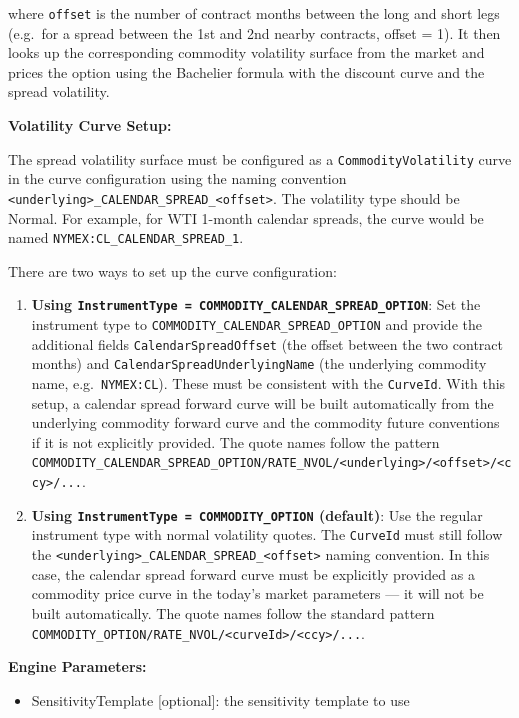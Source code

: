 where \texttt{offset} is the number of contract months between the long and short legs (e.g.\ for a spread between the
1st and 2nd nearby contracts, offset = 1). It then looks up the corresponding commodity volatility surface from the
market and prices the option using the Bachelier formula with the discount curve and the spread volatility.

\textbf{Volatility Curve Setup:}

The spread volatility surface must be configured as a \texttt{CommodityVolatility} curve in the curve configuration
using the naming convention \texttt{<underlying>\_CALENDAR\_SPREAD\_<offset>}. The volatility type should be Normal.
For example, for WTI 1-month calendar spreads, the curve would be named \texttt{NYMEX:CL\_CALENDAR\_SPREAD\_1}.

There are two ways to set up the curve configuration:

\begin{enumerate}
\item \textbf{Using \texttt{InstrumentType = COMMODITY\_CALENDAR\_SPREAD\_OPTION}}: Set the instrument type to
  \texttt{COMMODITY\_CALENDAR\_SPREAD\_OPTION} and provide the additional fields \texttt{CalendarSpreadOffset} (the
  offset between the two contract months) and \texttt{CalendarSpreadUnderlyingName} (the underlying commodity name,
  e.g.\ \texttt{NYMEX:CL}). These must be consistent with the \texttt{CurveId}. With this setup, a calendar spread
  forward curve will be built automatically from the underlying commodity forward curve and the commodity future
  conventions if it is not explicitly provided. The quote names follow the pattern
  \texttt{COMMODITY\_CALENDAR\_SPREAD\_OPTION/RATE\_NVOL/<underlying>/<offset>/<ccy>/...}.

\item \textbf{Using \texttt{InstrumentType = COMMODITY\_OPTION} (default)}: Use the regular instrument type with normal
  volatility quotes. The \texttt{CurveId} must still follow the
  \texttt{<underlying>\_CALENDAR\_SPREAD\_<offset>} naming convention. In this case, the calendar spread forward curve
  must be explicitly provided as a commodity price curve in the today's market parameters --- it will not be built
  automatically. The quote names follow the standard pattern
  \texttt{COMMODITY\_OPTION/RATE\_NVOL/<curveId>/<ccy>/...}.
\end{enumerate}

\textbf{Engine Parameters:}

\begin{itemize}
\item SensitivityTemplate [optional]: the sensitivity template to use
\end{itemize}


